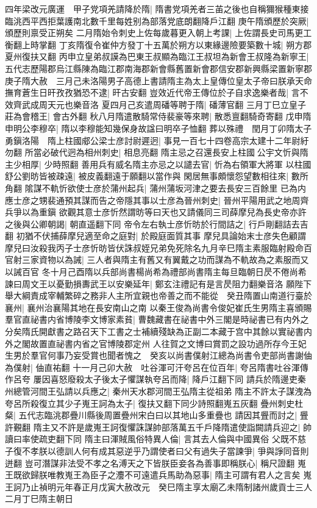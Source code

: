 四年梁改元廣運　甲子党項羌請降於隋|{
	隋書党項羌者三苖之後也自稱獮猴種東接臨洮西平西拒葉護南北數千里每姓别為部落党底朗翻降戶江翻}
庚午隋頒歷於突厥|{
	頒歷則禀受正朔矣}
二月隋始令刺史上佐每歲暮更入朝上考課|{
	上佐謂長史司馬更工衡翻上時掌翻}
丁亥隋復令崔仲方發丁十五萬於朔方以東緣邊險要築數十城|{
	朔方郡夏州復扶又翻}
丙申立皇弟叔謨為巴東王叔顯為臨江王叔坦為新會王叔隆為新寧王|{
	五代志歷陽郡烏江縣陳為臨江郡南海郡新會縣舊置新會郡信安郡新興縣梁置新寧郡}
庚子隋大赦　三月己未洛陽男子高德上書請隋主為太上皇傳位皇太子帝曰朕承天命撫育蒼生日旰孜孜猶恐不逮|{
	旰古安翻}
豈效近代帝王傳位於子自求逸樂者哉|{
	言不效齊武成周天元也樂音洛}
夏四月己亥遣周磻等聘于隋|{
	磻薄官翻}
三月丁巳立皇子莊為會稽王|{
	會古外翻}
秋八月隋遣散騎常侍裴豪等來聘|{
	散悉亶翻騎奇寄翻}
戊申隋申明公李穆卒|{
	隋以李穆能知幾保身故諡曰明卒子恤翻}
葬以殊禮　閏月丁卯隋太子勇鎭洛陽　隋上柱國郕公梁士彦討尉遲迥|{
	事見一百七十四卷高宗太建十二年尉紆勿翻}
所當必破代迥為相州刺史|{
	相息亮翻}
隋主忌之召還長安上柱國公宇文忻與隋主少相厚|{
	少時照翻}
善用兵有威名隋主亦忌之以譴去官|{
	忻為右領軍大將軍}
以柱國舒公劉昉皆被疎遠|{
	被皮義翻遠于願翻以當作與}
閑居無事頗懷怨望數相往來|{
	數所角翻}
隂謀不軌忻欲使士彦於蒲州起兵|{
	蒲州蒲坂河津之要去長安三百餘里}
已為内應士彦之甥裴通預其謀而告之帝隱其事以士彦為晉州刺史|{
	晉州平陽用武之地周齊兵爭以為重鎭}
欲觀其意士彦忻然謂昉等曰天也又請儀同三司薛摩兒為長史帝亦許之後與公卿朝謁|{
	朝直遥翻下同}
帝令左右執士彦忻昉於行間詰之|{
	行戶剛翻詰去吉翻}
初猶不伏捕薛摩兒適至命之庭對|{
	於殿庭面質其事}
摩兒具論始末士彦失色顧謂摩兒曰汝殺我丙子士彦忻昉皆伏誅叔姪兄弟免死除名九月辛巳隋主素服臨射殿命百官射三家資物以為誡|{
	三人者與隋主有舊又有翼戴之功而謀為不軌故為之素服而又以誡百官}
冬十月己酉隋以兵部尚書楊尚希為禮部尚書隋主每旦臨朝日昃不倦尚希諫曰周文王以憂勤損夀武王以安樂延年|{
	鄭玄注禮記有是言昃阻力翻樂音洛}
願陛下舉大綱責成宰輔繁碎之務非人主所宜親也帝善之而不能從　癸丑隋置山南道行臺於襄州|{
	襄州治襄陽其地在長安南山之南}
以秦王俊為尚書令俊妃崔氏生男隋主喜頒賜羣官直祕書内省博陵李文博家素貧|{
	曹魏藏書在祕書中外三閣是時祕書已有内外之分矣隋氏開獻書之路召天下工書之士補續殘缺為正副二本藏于宫中其餘以實祕書内外之閣故置直祕書内省之官博陵郡定州}
人往賀之文博曰賞罰之設功過所存今王妃生男於羣官何事乃妄受賞也聞者愧之　癸亥以尚書僕射江總為尚書令吏部尚書謝伷為僕射|{
	伷直祐翻}
十一月己卯大赦　吐谷渾可汗夸呂在位百年|{
	夸呂隋書吐谷渾傳作呂夸}
屢因喜怒廢殺太子後太子懼謀執夸呂而降|{
	降戶江翻下同}
請兵於隋邊吏秦州總管河間王弘請以兵應之|{
	秦州天水郡河間王弘隋主從祖弟}
隋主不許太子謀洩為夸呂所殺復立其少子嵬王訶為太子|{
	復扶又翻下同少詩照翻嵬五灰翻}
疊州刺史杜粲|{
	五代志臨洮郡疊川縣後周置疊州宋白曰以其地山多重疊也}
請因其舋而討之|{
	舋許覲翻}
隋主又不許是歲嵬王訶復懼誅謀帥部落萬五千戶降隋遣使詣闕請兵迎之|{
	帥讀曰率使疏吏翻下同}
隋主曰渾賊風俗特異人倫|{
	言其去人倫與中國異俗}
父既不慈子復不孝朕以德訓人何有成其惡逆乎乃謂使者曰父有過失子當諫爭|{
	爭與諍同音則迸翻}
豈可潛謀非法受不孝之名溥天之下皆朕臣妾各為善事即稱朕心|{
	稱尺證翻}
嵬王既欲歸朕唯教嵬王為臣子之灋不可遠遣兵馬助為惡事|{
	隋主可謂有君人之言矣}
嵬王訶乃止禎明元年春正月戊寅大赦改元　癸巳隋主享太廟乙未隋制諸州歲貢士三人　二月丁巳隋主朝日

